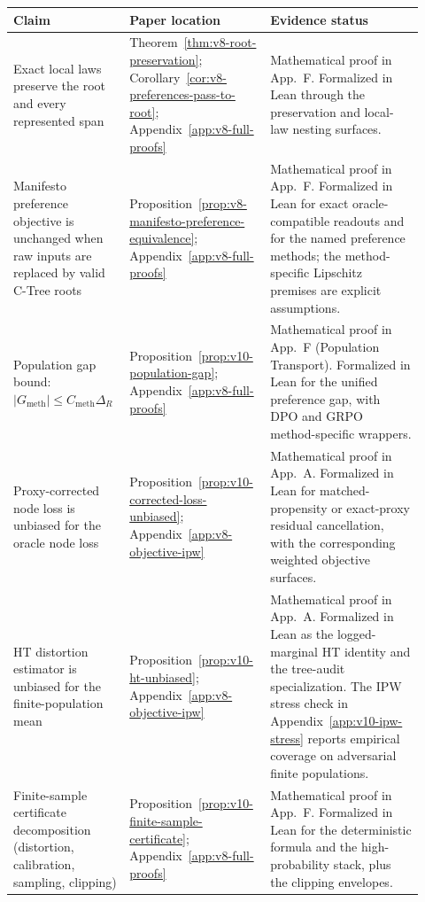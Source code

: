\begin{table}[t]
\centering
\scriptsize
\renewcommand{\arraystretch}{1.15}
\begin{tabular}{@{}p{0.26\linewidth}p{0.30\linewidth}p{0.36\linewidth}@{}}
\toprule
Claim & Paper location & Evidence status \\
\midrule
Exact local laws preserve the root and every represented span &
Theorem~\ref{thm:v8-root-preservation};
Corollary~\ref{cor:v8-preferences-pass-to-root};
Appendix~\ref{app:v8-full-proofs} &
Mathematical proof in App.~F. Formalized in Lean through the
preservation and local-law nesting surfaces. \\
\addlinespace
Manifesto preference objective is unchanged when raw inputs are
replaced by valid C-Tree roots &
Proposition~\ref{prop:v8-manifesto-preference-equivalence};
Appendix~\ref{app:v8-full-proofs} &
Mathematical proof in App.~F. Formalized in Lean for exact
oracle-compatible readouts and for the named preference methods;
the method-specific Lipschitz premises are explicit assumptions. \\
\addlinespace
Population gap bound:
\(|G_{\mathrm{meth}}|\le C_{\mathrm{meth}}\Delta_R\) &
Proposition~\ref{prop:v10-population-gap};
Appendix~\ref{app:v8-full-proofs} &
Mathematical proof in App.~F (Population Transport). Formalized in
Lean for the unified preference gap, with DPO and GRPO method-specific
wrappers. \\
\addlinespace
Proxy-corrected node loss is unbiased for the oracle node loss &
Proposition~\ref{prop:v10-corrected-loss-unbiased};
Appendix~\ref{app:v8-objective-ipw} &
Mathematical proof in App.~A. Formalized in Lean for matched-propensity
or exact-proxy residual cancellation, with the corresponding weighted
objective surfaces. \\
\addlinespace
HT distortion estimator is unbiased for the finite-population mean &
Proposition~\ref{prop:v10-ht-unbiased};
Appendix~\ref{app:v8-objective-ipw} &
Mathematical proof in App.~A. Formalized in Lean as the
logged-marginal HT identity and the tree-audit specialization. The
IPW stress check in Appendix~\ref{app:v10-ipw-stress} reports empirical
coverage on adversarial finite populations. \\
\addlinespace
Finite-sample certificate decomposition (distortion, calibration,
sampling, clipping) &
Proposition~\ref{prop:v10-finite-sample-certificate};
Appendix~\ref{app:v8-full-proofs} &
Mathematical proof in App.~F. Formalized in Lean for the
deterministic formula and the high-probability stack, plus the
clipping envelopes. \\

\end{tabular}
\end{table}
